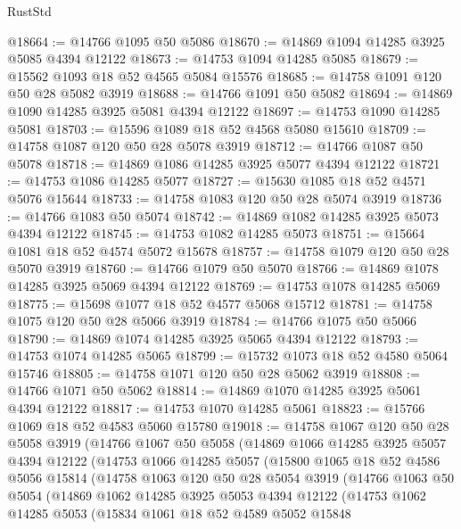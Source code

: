 \begin{lexlean}{RustStd}
\begin{coremodule}
@18664 := @14766 @1095 @50 @5086
@18670 := @14869 @1094 @14285 @3925 @5085 @4394 @12122
@18673 := @14753 @1094 @14285 @5085
@18679 := @15562 @1093 @18 @52 @4565 @5084 @15576
@18685 := @14758 @1091 @120 @50 @28 @5082 @3919
@18688 := @14766 @1091 @50 @5082
@18694 := @14869 @1090 @14285 @3925 @5081 @4394 @12122
@18697 := @14753 @1090 @14285 @5081
@18703 := @15596 @1089 @18 @52 @4568 @5080 @15610
@18709 := @14758 @1087 @120 @50 @28 @5078 @3919
@18712 := @14766 @1087 @50 @5078
@18718 := @14869 @1086 @14285 @3925 @5077 @4394 @12122
@18721 := @14753 @1086 @14285 @5077
@18727 := @15630 @1085 @18 @52 @4571 @5076 @15644
@18733 := @14758 @1083 @120 @50 @28 @5074 @3919
@18736 := @14766 @1083 @50 @5074
@18742 := @14869 @1082 @14285 @3925 @5073 @4394 @12122
@18745 := @14753 @1082 @14285 @5073
@18751 := @15664 @1081 @18 @52 @4574 @5072 @15678
@18757 := @14758 @1079 @120 @50 @28 @5070 @3919
@18760 := @14766 @1079 @50 @5070
@18766 := @14869 @1078 @14285 @3925 @5069 @4394 @12122
@18769 := @14753 @1078 @14285 @5069
@18775 := @15698 @1077 @18 @52 @4577 @5068 @15712
@18781 := @14758 @1075 @120 @50 @28 @5066 @3919
@18784 := @14766 @1075 @50 @5066
@18790 := @14869 @1074 @14285 @3925 @5065 @4394 @12122
@18793 := @14753 @1074 @14285 @5065
@18799 := @15732 @1073 @18 @52 @4580 @5064 @15746
@18805 := @14758 @1071 @120 @50 @28 @5062 @3919
@18808 := @14766 @1071 @50 @5062
@18814 := @14869 @1070 @14285 @3925 @5061 @4394 @12122
@18817 := @14753 @1070 @14285 @5061
@18823 := @15766 @1069 @18 @52 @4583 @5060 @15780
@19018 := @14758
    @1067
    @120
    @50
    @28
    @5058
    @3919
    (@14766
      @1067
      @50
      @5058
      (@14869
        @1066
        @14285
        @3925
        @5057
        @4394
        @12122
        (@14753
          @1066
          @14285
          @5057
          (@15800
            @1065
            @18
            @52
            @4586
            @5056
            @15814
            (@14758
              @1063
              @120
              @50
              @28
              @5054
              @3919
              (@14766
                @1063
                @50
                @5054
                (@14869
                  @1062
                  @14285
                  @3925
                  @5053
                  @4394
                  @12122
                  (@14753
                    @1062
                    @14285
                    @5053
                    (@15834
                      @1061
                      @18
                      @52
                      @4589
                      @5052
                      @15848

\end{coremodule}
\end{lexlean}
